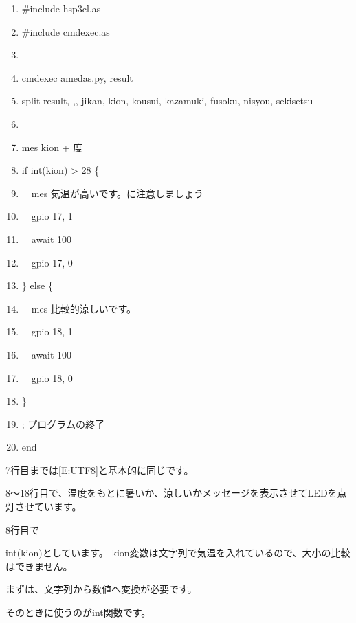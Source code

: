\documentclass[a4paper,12pt,dvipdfmx]{jarticle}
\begin{document}
\begin{center}
\begin{boxedminipage}{15.272cm}
\begin{enumerate}
\setlength{\itemsep}{0cm} %
\item \#include {\textquotedbl}hsp3cl.as{\textquotedbl}
\item \#include {\textquotedbl}cmdexec.as{\textquotedbl}
\item
\item cmdexec {\textquotedbl}amedas.py{\textquotedbl}, result
\item split result, {\textquotedbl},{\textquotedbl}, jikan, kion, kousui, kazamuki, fusoku, nisyou, sekisetsu
\item
\item mes kion + {\textquotedbl}度{\textquotedbl}
\item if int(kion) {\textgreater} 28 \{
\item \ \ mes
{\textquotedbl}気温が高いです。に注意しましょう{\textquotedbl}
\item \ \ gpio 17, 1
\item \ \ await 100
\item \ \ gpio 17, 0
\item \} else \{
\item \ \ mes {\textquotedbl}比較的涼しいです。{\textquotedbl}
\item \ \ gpio 18, 1
\item \ \ await 100
\item \ \ gpio 18, 0
\item \}
\item ; プログラムの終了
\item end
\end{enumerate}
\end{boxedminipage}
\end{center}

\bigskip



\bigskip

7行目までは\ref*{E:UTF8}と基本的に同じです。

8〜18行目で、温度をもとに暑いか、涼しいかメッセージを表示させてLEDを点灯させています。

8行目で

int(kion)としています。
kion変数は文字列で気温を入れているので、大小の比較はできません。

まずは、文字列から数値へ変換が必要です。

そのときに使うのがint関数です。
\end{document}
